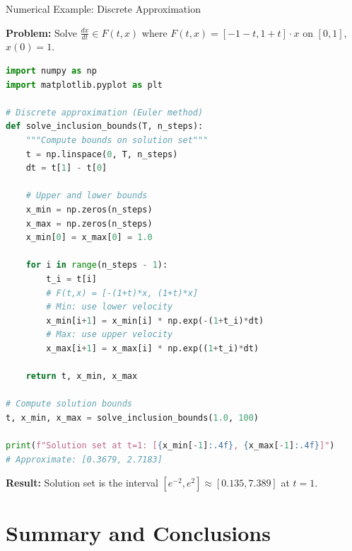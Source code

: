 \documentclass[aspectratio=169,10pt]{beamer}
\theoremstyle{definition}
\begin{document}
\begin{frame}[fragile]{Numerical Example: Discrete Approximation}

\textbf{Problem:} Solve $\frac{dx}{dt} \in F(t, x)$ where $F(t, x) = [-1-t, 1+t] \cdot x$ on $[0,1]$, $x(0)=1$.

\begin{lstlisting}[language=Python]
import numpy as np
import matplotlib.pyplot as plt

# Discrete approximation (Euler method)
def solve_inclusion_bounds(T, n_steps):
    """Compute bounds on solution set"""
    t = np.linspace(0, T, n_steps)
    dt = t[1] - t[0]

    # Upper and lower bounds
    x_min = np.zeros(n_steps)
    x_max = np.zeros(n_steps)
    x_min[0] = x_max[0] = 1.0

    for i in range(n_steps - 1):
        t_i = t[i]
        # F(t,x) = [-(1+t)*x, (1+t)*x]
        # Min: use lower velocity
        x_min[i+1] = x_min[i] * np.exp(-(1+t_i)*dt)
        # Max: use upper velocity
        x_max[i+1] = x_max[i] * np.exp((1+t_i)*dt)

    return t, x_min, x_max

# Compute solution bounds
t, x_min, x_max = solve_inclusion_bounds(1.0, 100)

print(f"Solution set at t=1: [{x_min[-1]:.4f}, {x_max[-1]:.4f}]")
# Approximate: [0.3679, 2.7183]
\end{lstlisting}

\textbf{Result:} Solution set is the interval $[e^{-2}, e^{2}] \approx [0.135, 7.389]$ at $t=1$.

\end{frame}

\section{Summary and Conclusions}
\end{document}
